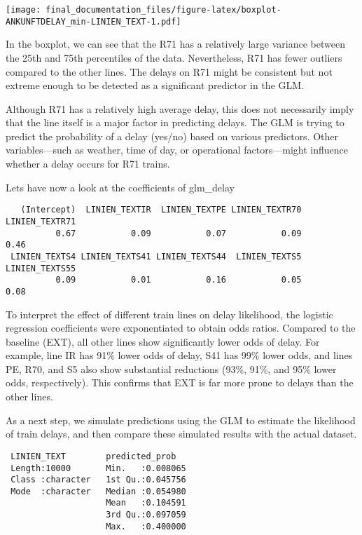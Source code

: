 \documentclass[
]{article}
\begin{document}
\texttt{[image: final\_documentation\_files/figure-latex/boxplot-ANKUNFTDELAY\_min-LINIEN\_TEXT-1.pdf]}

In the boxplot, we can see that the R71 has a relatively large variance
between the 25th and 75th percentiles of the data. Nevertheless, R71 has
fewer outliers compared to the other lines. The delays on R71 might be
consistent but not extreme enough to be detected as a significant
predictor in the GLM.

Although R71 has a relatively high average delay, this does not
necessarily imply that the line itself is a major factor in predicting
delays. The GLM is trying to predict the probability of a delay (yes/no)
based on various predictors. Other variables---such as weather, time of
day, or operational factors---might influence whether a delay occurs for
R71 trains.

Lets have now a look at the coefficients of glm\_delay

\begin{verbatim}
   (Intercept)  LINIEN_TEXTIR  LINIEN_TEXTPE LINIEN_TEXTR70 LINIEN_TEXTR71 
          0.67           0.09           0.07           0.09           0.46 
 LINIEN_TEXTS4 LINIEN_TEXTS41 LINIEN_TEXTS44  LINIEN_TEXTS5 LINIEN_TEXTS55 
          0.09           0.01           0.16           0.05           0.08 
\end{verbatim}

To interpret the effect of different train lines on delay likelihood,
the logistic regression coefficients were exponentiated to obtain odds
ratios. Compared to the baseline (EXT), all other lines show
significantly lower odds of delay. For example, line IR has 91\% lower
odds of delay, S41 has 99\% lower odds, and lines PE, R70, and S5 also
show substantial reductions (93\%, 91\%, and 95\% lower odds,
respectively). This confirms that EXT is far more prone to delays than
the other lines.

As a next step, we simulate predictions using the GLM to estimate the
likelihood of train delays, and then compare these simulated results
with the actual dataset.

\begin{verbatim}
 LINIEN_TEXT        predicted_prob    
 Length:10000       Min.   :0.008065  
 Class :character   1st Qu.:0.045756  
 Mode  :character   Median :0.054980  
                    Mean   :0.104591  
                    3rd Qu.:0.097059  
                    Max.   :0.400000  
\end{verbatim}
\end{document}
